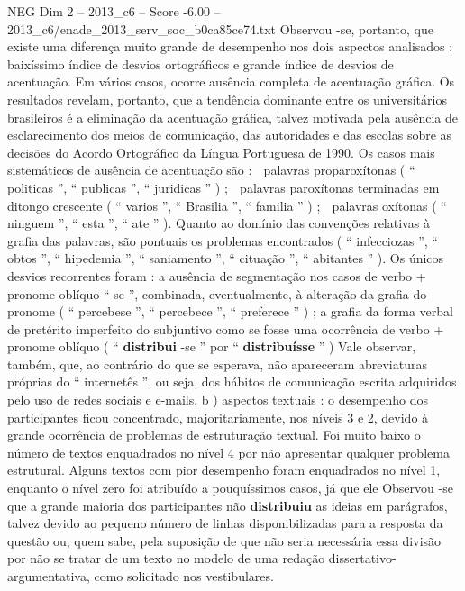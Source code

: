 \begin{textsample}{NEG Dim 2 – 2013\_c6 – Score -6.00 – 2013\_c6/enade\_2013\_serv\_soc\_b0ca85ce74.txt}
Observou -se, portanto, que existe uma diferença muito grande de desempenho nos dois aspectos analisados : baixíssimo índice de desvios ortográficos e grande índice de desvios de acentuação.
Em vários casos, ocorre ausência completa de acentuação gráfica.
Os resultados revelam, portanto, que a tendência dominante entre os universitários brasileiros é a eliminação da acentuação gráfica, talvez motivada pela ausência de esclarecimento dos meios de comunicação, das autoridades e das escolas sobre as decisões do Acordo Ortográfico da Língua Portuguesa de 1990.
Os casos mais sistemáticos de ausência de acentuação são :  palavras proparoxítonas ( “ politicas ”, “ publicas ”, “ juridicas ” ) ;  palavras paroxítonas terminadas em ditongo crescente ( “ varios ”, “ Brasilia ”, “ familia ” ) ;  palavras oxítonas ( “ ninguem ”, “ esta ”, “ ate ” ).
Quanto ao domínio das convenções relativas à grafia das palavras, são pontuais os problemas encontrados ( “ infecciozas ”, “ obtos ”, “ hipedemia ”, “ saniamento ”, “ cituação ”, “ abitantes ” ).
Os únicos desvios recorrentes foram : a ausência de segmentação nos casos de verbo + pronome oblíquo “ se ”, combinada, eventualmente, à alteração da grafia do pronome ( “ percebese ”, “ percebece ”, “ preferece ” ) ; a grafia da forma verbal de pretérito imperfeito do subjuntivo como se fosse uma ocorrência de verbo + pronome oblíquo ( “ \textbf{distribui} -se ” por “ \textbf{distribuísse} ” ) Vale observar, também, que, ao contrário do que se esperava, não apareceram abreviaturas próprias do “ internetês ”, ou seja, dos hábitos de comunicação escrita adquiridos pelo uso de redes sociais e e-mails. b ) aspectos textuais : o desempenho dos participantes ficou concentrado, majoritariamente, nos níveis 3 e 2, devido à grande ocorrência de problemas de estruturação textual.
Foi muito baixo o número de textos enquadrados no nível 4 por não apresentar qualquer problema estrutural.
Alguns textos com pior desempenho foram enquadrados no nível 1, enquanto o nível zero foi atribuído a pouquíssimos casos, já que ele Observou -se que a grande maioria dos participantes não \textbf{distribuiu} as ideias em parágrafos, talvez devido ao pequeno número de linhas disponibilizadas para a resposta da questão ou, quem sabe, pela suposição de que não seria necessária essa divisão por não se tratar de um texto no modelo de uma redação dissertativo-argumentativa, como solicitado nos vestibulares.

\end{textsample}
